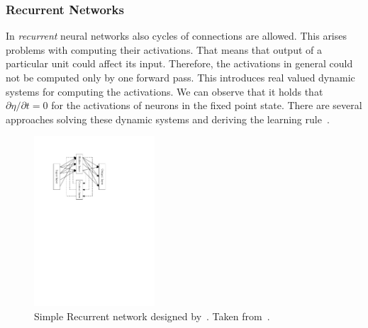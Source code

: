 \subsubsection{Recurrent Networks}
\label{sec:theory-recurrent} 

In \emph{recurrent} neural networks also cycles of connections are allowed. This arises problems with computing their activations. That means that output of a particular unit could affect its input. Therefore, the activations in general could not be computed only by one forward pass. This introduces real valued dynamic systems for computing the activations. We can observe that it holds that $\partial\eta / \partial t = 0$ for the activations of neurons in the fixed point state. There are several approaches solving these dynamic systems and deriving the learning rule~\citep{pineda1987generalization, pearlmutter1989learning, williams1989learning, elman1990finding, haykin1994neural}. 

\begin{figure}[H]
  \centering
  \includegraphics[width=0.4\textwidth]{img/models-recurrent.pdf}    
  \caption{Simple Recurrent network designed by~\citet{elman1990finding}. Taken from~\citet{haykin1994neural}.} 
  \label{fig:theory-recurrent}
\end{figure}

